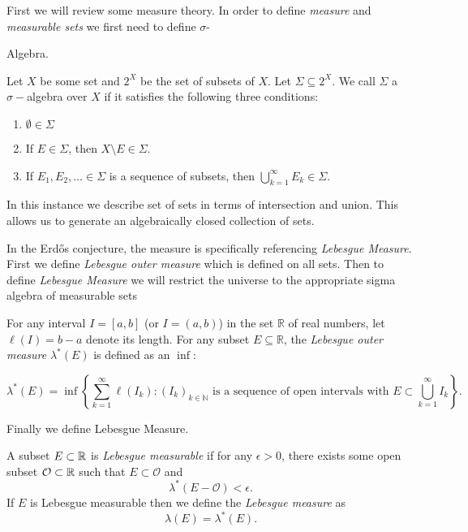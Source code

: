 First we will review some measure theory.  In order to define \textit{measure} and \textit{measurable sets} we first need to define $\sigma$\hyphen{Algebra.   



\begin{definition}
    Let $X$ be some set and $2^X$ be the set of subsets of $X$. Let $\Sigma \subseteq 2^X$. We call $\Sigma$ a $\sigma-$algebra over $X$ if it satisfies the following three conditions:
    \begin{enumerate}
        \item $\emptyset \in \Sigma$
        \item If $E \in \Sigma$, then $X\setminus E \in \Sigma$. 
        \item If $E_1, E_2, \dots \in \Sigma$ is a sequence of subsets, then $\bigcup_{k=1}^\infty E_k \in \Sigma$. 
    \end{enumerate}
\end{definition}

In this instance we describe set of sets in terms of intersection and union.  This allows us to generate an algebraically closed collection of sets.  

In the Erd\H{o}s conjecture, the measure is specifically referencing \textit{Lebesgue Measure}.  First we define \textit{Lebesgue outer measure} which is defined on all sets. Then to define \textit{Lebesgue Measure} we will restrict the universe to the appropriate sigma algebra of measurable sets

\begin{definition}
    For any interval $I = [a,b]$ (or $I = (a, b)$) in the set $\mathbb{R}$ of real numbers, let $\ell(I)= b - a$ denote its length. For any subset $E\subseteq\mathbb{R}$, the \textit{Lebesgue outer measure} $\lambda^*(E)$ is defined as an $\inf:$ 
    
    $$\lambda^*(E) = \inf \left\{\sum_{k=1}^\infty \ell(I_k) : {(I_k)_{k \in \mathbb N}} \text{ is a sequence of open intervals with } E\subset \bigcup_{k=1}^\infty I_k\right\}.$$
\end{definition}

Finally we define Lebesgue Measure. 
\begin{definition}
    A subset $E\subset \mathbb{R}$ is \textit{Lebesgue measurable} if for any $\epsilon > 0$, there exists some open subset $\mathcal{O}\subset \mathbb{R}$ such that 
    $E\subset \mathcal{O}$ and 
    $$\lambda^*(E - \mathcal{O}) < \epsilon. $$
    If $E$ is Lebesgue measurable then we define the \textit{Lebesgue measure} as 
    $$\lambda(E) = \lambda^*(E).$$
\end{definition}

}
